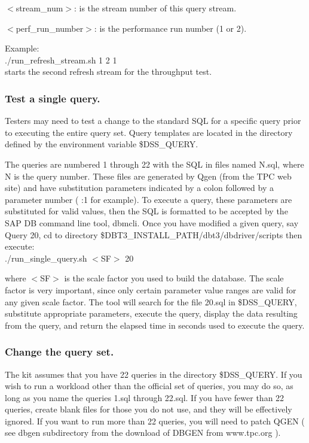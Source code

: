 \documentclass{article}
\begin{document}
\noindent
$<$stream\_num$>$: is the stream number of this query stream.

\noindent
$<$perf\_run\_number$>$: is the performance run number (1 or 2).  

\noindent
Example: \\
\indent ./run\_refresh\_stream.sh 1 2 1 \\
\indent starts the second refresh stream for the throughput test.  

\subsubsection{Test a single query.}

\noindent
Testers may need to test a change to the standard SQL for a specific
query prior to executing the entire query set.  Query templates are
located in the directory defined by the environment variable
\$DSS\_QUERY.

\noindent
The queries are numbered 1 through 22 with the SQL in files named
N.sql, where N is the query number.  These files  are generated by
Qgen (from the TPC web site) and have substitution parameters
indicated by a colon followed by a parameter number ( :1 for
example).  To execute a query, these parameters are substituted for
valid values, then the SQL is formatted to be accepted by the SAP DB
command line tool, dbmcli.  Once you have modified a given query, say
Query 20, cd to directory \$DBT3\_INSTALL\_PATH/dbt3/dbdriver/scripts
then execute: \\
\indent ./run\_single\_query.sh $<$SF$>$  20 

\noindent
where $<$SF$>$ is the scale factor you used to build the database.  The
scale factor is very important, since only certain parameter value
ranges are valid for any given scale factor.  The tool will search
for the file 20.sql in  \$DSS\_QUERY, substitute appropriate
parameters, execute the query, display the data resulting from the
query, and return the elapsed time in seconds used to execute the
query.

\subsubsection{Change the query set.}

\noindent
The kit assumes that you have 22 queries in the directory \$DSS\_QUERY.
If you wish to run a workload other than the official set of queries,
you may do so, as long as you name the queries 1.sql through 22.sql.
If you have fewer than 22 queries, create blank files for those you
do not use, and they will be effectively ignored.  If you want to run
more than 22 queries, you will need to patch QGEN ( see dbgen
subdirectory from the download of DBGEN from www.tpc.org ).  
\end{document}
